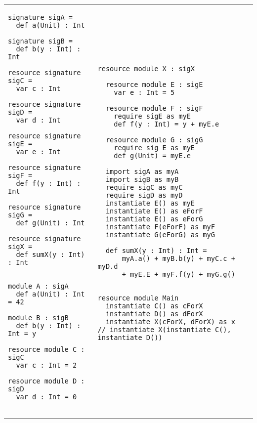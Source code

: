 \documentclass{llncs}
\begin{document}
\begin{tabular}{p{}p{}}
\begin{minipage}[t]{\textwidth}
\begin{lstlisting}
signature sigA = 
  def a(Unit) : Int

signature sigB =
  def b(y : Int) : Int

resource signature sigC =
  var c : Int

resource signature sigD =
  var d : Int

resource signature sigE =
  var e : Int
  
resource signature sigF =
  def f(y : Int) : Int
  
resource signature sigG =
  def g(Unit) : Int

resource signature sigX =
  def sumX(y : Int) : Int


module A : sigA
  def a(Unit) : Int = 42

module B : sigB
  def b(y : Int) : Int = y

resource module C : sigC
  var c : Int = 2

resource module D : sigD
  var d : Int = 0
  
\end{lstlisting}
\end{minipage}
&
\hspace{-10ex}
\begin{minipage}[t]{\textwidth}
\begin{lstlisting}
resource module X : sigX

  resource module E : sigE
    var e : Int = 5

  resource module F : sigF
    require sigE as myE
    def f(y : Int) = y + myE.e

  resource module G : sigG
    require sig E as myE
    def g(Unit) = myE.e

  import sigA as myA
  import sigB as myB
  require sigC as myC
  require sigD as myD
  instantiate E() as myE
  instantiate E() as eForF
  instantiate E() as eForG
  instantiate F(eForF) as myF
  instantiate G(eForG) as myG

  def sumX(y : Int) : Int = 
      myA.a() + myB.b(y) + myC.c + myD.d
      + myE.E + myF.f(y) + myG.g()


resource module Main
  instantiate C() as cForX
  instantiate D() as dForX
  instantiate X(cForX, dForX) as x
// instantiate X(instantiate C(), instantiate D())



\end{lstlisting}
\end{minipage}
\end{tabular}
\end{document}
